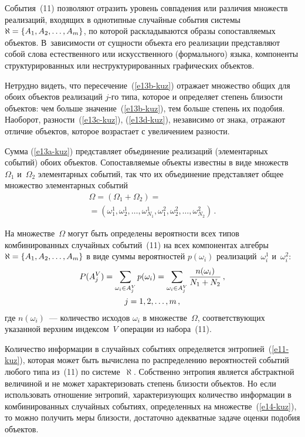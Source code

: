 \begin{multicols}{2}
  \setcounter{equation}{11}

  События~(11) позволяют отразить уровень совпадения или различия
множеств реализаций, входящих в однотипные случайные события системы
$\aleph\hm=\{A_1, A_2, \ldots , A_m\}$, по которой раскладываются образы
сопоставляемых объектов. В~зависимости от сущности объекта его реализации
представляют собой слова естественного или искусственного (формального)
языка, компоненты структурированных или неструктурированных графических
объектов.

  Нетрудно видеть, что пересечение~(\ref{e13b-kuz}) отражает множество
общих для обоих объектов реализаций $j$-го типа, которое и определяет
степень близости объектов: чем больше значение~(\ref{e13b-kuz}), тем больше
степень их подобия. Наоборот, разности~(\ref{e13c-kuz}), (\ref{e13d-kuz}),
независимо от знака, отражают отличие объектов, которое возрастает с
увеличением разности.

  Сумма (\ref{e13a-kuz}) представляет объединение реализаций (элементарных
событий) обоих объектов. Сопоставляемые объекты известны в виде
множеств~$\Omega_1$ и~$\Omega_2$ элементарных событий, так что их
объединение представляет общее множество элементарных событий
  \begin{multline}
  \Omega = (\Omega_1+\Omega_2) ={}\\
  {}=(\omega_1^1, \omega_2^1, \ldots
, \omega^1_{N_1}, \omega_1^2, \omega_2^2,\ldots ,
\omega^2_{N_2})\,.
  \label{e14-kuz}
  \end{multline}

  На множестве~$\Omega$ могут быть определены вероятности всех типов
комбинированных случайных событий~(11) на всех компонентах алгебры
$\aleph \hm=\{A_1, A_2, \ldots , A_m\}$ в виде суммы вероятностей $p(\omega_i)$
реализаций~$\omega_i^1$ и~$\omega_i^2$:
  \begin{multline*}
  P(A_j^V) =\sum\limits_{\omega_i\in A_j^V} p(\omega_i)
=\sum\limits_{\omega_i\in A_j^V}\displaystyle\frac{\displaystyle  n(\omega_i)\mathstrut}{\displaystyle N_1+N_2\mathstrut}\,,\\ j=1,2,\ldots ,
m\,,
  \end{multline*}
где $n(\omega_i)$~--- количество исходов $\omega_i$ в множестве~$\Omega$,
соответствующих указанной верхним индексом~$V$ операции из набора~(11).

  Количество информации в случайных событиях определяется
энтропией~(\ref{e11-kuz}), которая может быть вычислена по распределению
вероятностей событий любого типа из~(11) по системе~$\aleph$. Собственно
энтропия является абстрактной величиной и не может характеризовать степень
близости объектов. Но если использовать отношение энтропий,
характеризующих количество информации в комбинированных случайных
событиях, определенных на множестве~(\ref{e14-kuz}), то можно получить
меры бли\-зости, достаточно адекватные задаче оценки подобия объектов.


\end{multicols}
